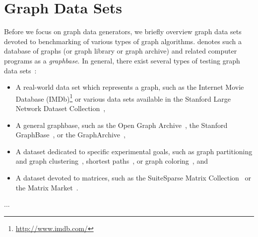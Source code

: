 \section{Graph Data Sets}

Before we focus on graph data generators, we briefly overview graph data sets devoted to benchmarking of various types of graph algorithms. \cite{Knuth:1993:SGP:164984} denotes such a  database of graphs (or graph library or graph archive) and related computer programs as a \emph{graphbase}. In general, there exist several types of testing graph data sets~\cite{Bachmaier2012}:

\begin{itemize}
  \item A real-world data set which represents a graph, such as the Internet Movie Database (IMDb)\footnote{\url{http://www.imdb.com/}} or various data sets available in the Stanford Large Network Dataset Collection~\cite{snapnets},
  \item A general graphbase, such as the Open Graph Archive~\cite{Bachmaier2012}, the Stanford GraphBase~\cite{Knuth:1993:SGP:164984}, or the GraphArchive~\cite{GraphArchive},
  \item A dataset dedicated to specific experimental goals, such as graph partitioning and graph clustering~\cite{10dimacs}, shortest paths~\cite{9dimacs}, or graph coloring~\cite{coloring}, and
  \item A dataset devoted to matrices, such as the SuiteSparse Matrix Collection~\cite{SuiteSparse} or  the Matrix Market~\cite{MatrixMarket}.
\end{itemize}


...
